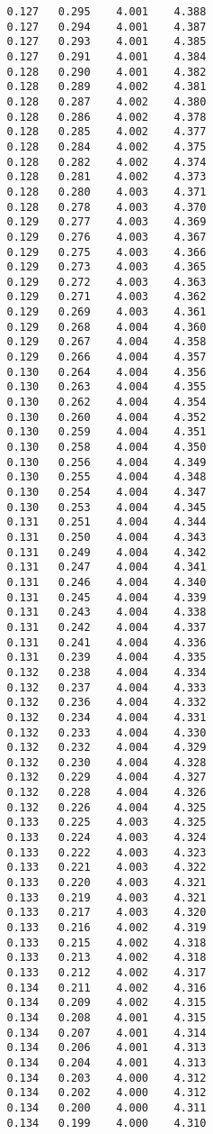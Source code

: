 \begin{verbatim}
   0.127   0.295    4.001    4.388
   0.127   0.294    4.001    4.387
   0.127   0.293    4.001    4.385
   0.127   0.291    4.001    4.384
   0.128   0.290    4.001    4.382
   0.128   0.289    4.002    4.381
   0.128   0.287    4.002    4.380
   0.128   0.286    4.002    4.378
   0.128   0.285    4.002    4.377
   0.128   0.284    4.002    4.375
   0.128   0.282    4.002    4.374
   0.128   0.281    4.002    4.373
   0.128   0.280    4.003    4.371
   0.128   0.278    4.003    4.370
   0.129   0.277    4.003    4.369
   0.129   0.276    4.003    4.367
   0.129   0.275    4.003    4.366
   0.129   0.273    4.003    4.365
   0.129   0.272    4.003    4.363
   0.129   0.271    4.003    4.362
   0.129   0.269    4.003    4.361
   0.129   0.268    4.004    4.360
   0.129   0.267    4.004    4.358
   0.129   0.266    4.004    4.357
   0.130   0.264    4.004    4.356
   0.130   0.263    4.004    4.355
   0.130   0.262    4.004    4.354
   0.130   0.260    4.004    4.352
   0.130   0.259    4.004    4.351
   0.130   0.258    4.004    4.350
   0.130   0.256    4.004    4.349
   0.130   0.255    4.004    4.348
   0.130   0.254    4.004    4.347
   0.130   0.253    4.004    4.345
   0.131   0.251    4.004    4.344
   0.131   0.250    4.004    4.343
   0.131   0.249    4.004    4.342
   0.131   0.247    4.004    4.341
   0.131   0.246    4.004    4.340
   0.131   0.245    4.004    4.339
   0.131   0.243    4.004    4.338
   0.131   0.242    4.004    4.337
   0.131   0.241    4.004    4.336
   0.131   0.239    4.004    4.335
   0.132   0.238    4.004    4.334
   0.132   0.237    4.004    4.333
   0.132   0.236    4.004    4.332
   0.132   0.234    4.004    4.331
   0.132   0.233    4.004    4.330
   0.132   0.232    4.004    4.329
   0.132   0.230    4.004    4.328
   0.132   0.229    4.004    4.327
   0.132   0.228    4.004    4.326
   0.132   0.226    4.004    4.325
   0.133   0.225    4.003    4.325
   0.133   0.224    4.003    4.324
   0.133   0.222    4.003    4.323
   0.133   0.221    4.003    4.322
   0.133   0.220    4.003    4.321
   0.133   0.219    4.003    4.321
   0.133   0.217    4.003    4.320
   0.133   0.216    4.002    4.319
   0.133   0.215    4.002    4.318
   0.133   0.213    4.002    4.318
   0.133   0.212    4.002    4.317
   0.134   0.211    4.002    4.316
   0.134   0.209    4.002    4.315
   0.134   0.208    4.001    4.315
   0.134   0.207    4.001    4.314
   0.134   0.206    4.001    4.313
   0.134   0.204    4.001    4.313
   0.134   0.203    4.000    4.312
   0.134   0.202    4.000    4.312
   0.134   0.200    4.000    4.311
   0.134   0.199    4.000    4.310

\end{verbatim}

